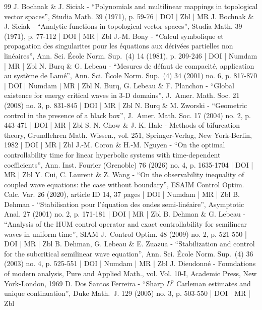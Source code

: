 \documentclass[10pt]{amsart}
\theoremstyle{definition}
\begin{document}
\begin{thebibliography}{99}
J. Bochnak \& J. Siciak - “Polynomials and multilinear mappings in topological vector spaces”, Studia Math. 39 (1971), p. 59-76 | DOI | Zbl | MR
J. Bochnak \& J. Siciak - “Analytic functions in topological vector spaces”, Studia Math. 39 (1971), p. 77-112 | DOI | MR | Zbl
J.-M. Bony - “Calcul symbolique et propagation des singularites pour les équations aux dérivées partielles non linéaires”, Ann. Sci. École Norm. Sup. (4) 14 (1981), p. 209-246 | DOI | Numdam | MR | Zbl
N. Burq \& G. Lebeau - “Mesures de défaut de compacité, application au système de Lamé”, Ann. Sci. École Norm. Sup. (4) 34 (2001) no. 6, p. 817-870 | DOI | Numdam | MR | Zbl
N. Burq, G. Lebeau \& F. Planchon - “Global existence for energy critical waves in 3-D domains”, J. Amer. Math. Soc. 21 (2008) no. 3, p. 831-845 | DOI | MR | Zbl
N. Burq \& M. Zworski - “Geometric control in the presence of a black box”, J. Amer. Math. Soc. 17 (2004) no. 2, p. 443-471 | DOI | MR | Zbl
S. N. Chow \& J. K. Hale - Methods of bifurcation theory, Grundlehren Math. Wissen., vol. 251, Springer-Verlag, New York-Berlin, 1982 | DOI | MR | Zbl
J.-M. Coron \& H.-M. Nguyen - “On the optimal controllability time for linear hyperbolic systems with time-dependent coefficients”, Ann. Inst. Fourier (Grenoble) 76 (2026) no. 4, p. 1635-1704 | DOI | MR | Zbl
Y. Cui, C. Laurent \& Z. Wang - “On the observability inequality of coupled wave equations: the case without boundary”, ESAIM Control Optim. Calc. Var. 26 (2020), article ID 14, 37 pages | DOI | Numdam | MR | Zbl
B. Dehman - “Stabilisation pour l’équation des ondes semi-linéaire”, Asymptotic Anal. 27 (2001) no. 2, p. 171-181 | DOI | MR | Zbl
B. Dehman \& G. Lebeau - “Analysis of the HUM control operator and exact controllability for semilinear waves in uniform time”, SIAM J. Control Optim. 48 (2009) no. 2, p. 521-550 | DOI | MR | Zbl
B. Dehman, G. Lebeau \& E. Zuazua - “Stabilization and control for the subcritical semilinear wave equation”, Ann. Sci. École Norm. Sup. (4) 36 (2003) no. 4, p. 525-551 | DOI | Numdam | MR | Zbl
J. Dieudonné - Foundations of modern analysis, Pure and Applied Math., vol. Vol. 10-I, Academic Press, New York-London, 1969
D. Dos Santos Ferreira - “Sharp $L^p$ Carleman estimates and unique continuation”, Duke Math. J. 129 (2005) no. 3, p. 503-550 | DOI | MR | Zbl

\end{thebibliography}
\end{document}

